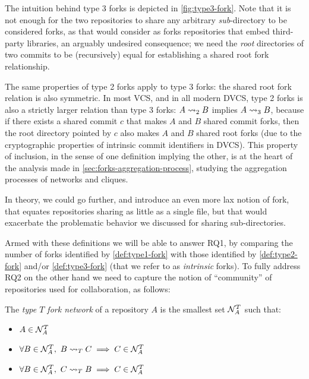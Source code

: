 The intuition behind type 3 forks is depicted in \cref{fig:type3-fork}. Note
that it is not enough for the two repositories to share any arbitrary
\emph{sub}-directory to be considered forks, as that would consider as forks
repositories that embed third-party libraries, an arguably undesired
consequence; we need the \emph{root} directories of two commits to be
(recursively) equal for establishing a shared root fork relationship.

The same properties of type 2 forks apply to type 3 forks: the shared root fork
relation is also symmetric. In most VCS, and in all modern DVCS, type 2 forks
is also a strictly larger relation than type 3 forks: $A\rightsquigarrow_2 B$ implies
$A\rightsquigarrow_3 B$, because if there exists a shared commit $c$ that makes $A$ and
$B$ shared commit forks, then the root directory pointed by $c$ also makes $A$
and $B$ shared root forks (due to the cryptographic properties of intrinsic
commit identifiers in DVCS).
This property of inclusion, in the sense of one definition implying the other,
is at the heart of the analysis made in \cref{sec:forks-aggregation-process},
studying the aggregation processes of networks and cliques.

In theory, we could go further, and introduce an even more lax notion of fork,
that equates repositories sharing as little as a single file, but that would
exacerbate the problematic behavior we discussed for sharing sub-directories.

Armed with these definitions we will be able to answer RQ1, by comparing the
number of forks identified by \cref{def:type1-fork} with those
identified by \cref{def:type2-fork} and/or \cref{def:type3-fork}
(that we refer to as \emph{intrinsic} forks).
To fully address RQ2 on the other hand we need to capture the notion of
``community'' of repositories used for collaboration, as follows:
\begin{definition}%
  \label{def:fork-network}
  The \emph{type $T$ fork network} of a repository $A$ is the smallest set
  $\mathcal{N}^T_A$ such that:
  \begin{itemize}
  \item $A\in\mathcal{N}^T_A$
  \item $\forall B\in\mathcal{N}^T_A,~B\rightsquigarrow_T C \implies C\in\mathcal{N}^T_A$
  \item $\forall B\in\mathcal{N}^T_A,~C\rightsquigarrow_T B \implies C\in\mathcal{N}^T_A$
  \end{itemize}
\end{definition}

